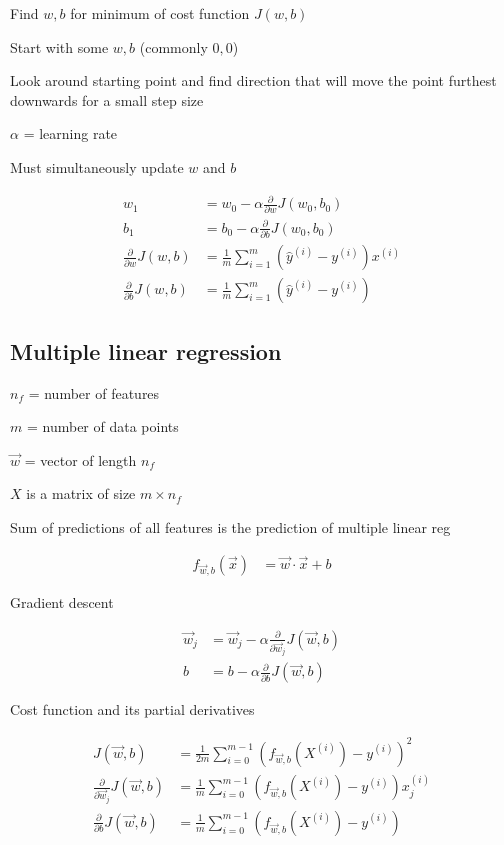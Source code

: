 \documentclass[12pt]{article}
\begin{document}
Find $w,b$ for minimum of cost function $J(w,b)$

\begin{myenumerate}
	\item Start with some $w,b$ (commonly $0,0$)
	\item Look around starting point and find direction that will move the point furthest downwards for a small step size
\end{myenumerate}

$\alpha$ = learning rate

Must simultaneously update $w$ and $b$

\begin{align*}
w_1 &= w_0 - \alpha \frac{\partial}{\partial w} J(w_0,b_0)\\
b_1 &= b_0 - \alpha \frac{\partial}{\partial b} J(w_0,b_0)\\
\frac{\partial}{\partial w} J(w,b) &= \frac{1}{m} \sum_{i=1}^m ({\hat y}^{(i)} - y^{(i)}) x^{(i)}\\
\frac{\partial}{\partial b} J(w,b) &= \frac{1}{m} \sum_{i=1}^m ({\hat y}^{(i)} - y^{(i)})
\end{align*}

\subsection{Multiple linear regression}

$n_f$ = number of features

$m$ = number of data points

$\vec{w}$ = vector of length $n_f$

$X$ is a matrix of size $m \times n_f$

Sum of predictions of all features is the prediction of multiple linear reg

\begin{align*}
f_{\vec{w},b}(\vec{x}) &= \vec{w} \cdot \vec{x} + b
\end{align*}

Gradient descent

\begin{align*}
\vec{w}_j &= \vec{w}_j - \alpha \frac{\partial}{\partial \vec{w}_j} J(\vec{w},b)\\
b &= b - \alpha \frac{\partial}{\partial b} J(\vec{w},b)
\end{align*}

Cost function and its partial derivatives

\begin{align*}
J(\vec{w},b) &= \frac{1}{2m} \sum_{i=0}^{m-1} (f_{\vec{w},b}(X^{(i)}) - y^{(i)})^2\\
\frac{\partial}{\partial \vec{w}_j} J(\vec{w},b) &= \frac{1}{m} \sum_{i=0}^{m-1} (f_{\vec{w},b}(X^{(i)}) - y^{(i)}) x_j^{(i)}\\
\frac{\partial}{\partial b} J(\vec{w},b) &= \frac{1}{m} \sum_{i=0}^{m-1} (f_{\vec{w},b}(X^{(i)}) - y^{(i)})
\end{align*}
\end{document}

